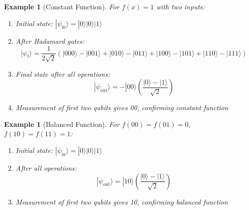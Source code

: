 \documentclass{article}
\newtheorem{example}[theorem]{Example}
\begin{document}
\begin{example}[Constant Function]
For $f(x) = 1$ with two inputs:
\begin{enumerate}
    \item Initial state: $|\psi_{\text{in}}\rangle = |0\rangle|0\rangle|1\rangle$
    \item After Hadamard gates:
    \[
    |\psi_t\rangle = \frac{1}{2\sqrt{2}}(|000\rangle - |001\rangle + |010\rangle - |011\rangle + |100\rangle - |101\rangle + |110\rangle - |111\rangle)
    \]
    \item Final state after all operations:
    \[
    |\psi_{\text{out}}\rangle = -|00\rangle\left(\frac{|0\rangle - |1\rangle}{\sqrt{2}}\right)
    \]
    \item Measurement of first two qubits gives 00, confirming constant function
\end{enumerate}
\end{example}

\begin{example}[Balanced Function]
For $f(00) = f(01) = 0$, $f(10) = f(11) = 1$:
\begin{enumerate}
    \item Initial state: $|\psi_{\text{in}}\rangle = |0\rangle|0\rangle|1\rangle$
    \item After all operations:
    \[
    |\psi_{\text{out}}\rangle = |10\rangle\left(\frac{|0\rangle - |1\rangle}{\sqrt{2}}\right)
    \]
    \item Measurement of first two qubits gives 10, confirming balanced function
\end{enumerate}
\end{example}
\end{document}
